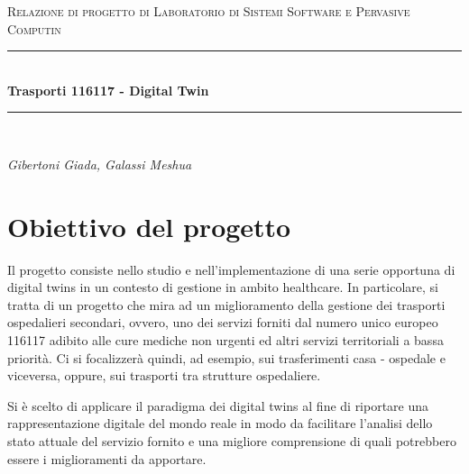 \documentclass[12pt]{article}
\begin{document}

\begin{titlepage}

\newcommand{\HRule}{\rule{\linewidth}{0.5mm}}
\center

\textsc{\Large Relazione di progetto di Laboratorio di Sistemi Software e Pervasive Computin}\\[0.5cm]

\HRule \\[0.4cm]
{ \huge \bfseries Trasporti 116117 - Digital Twin}\\[0.4cm]
\HRule \\[1.5cm]

\vfill

\begin{flushleft}
\emph{Gibertoni Giada, Galassi Meshua}\\[3cm]

\end{flushleft}



\end{titlepage}


\tableofcontents

\newpage

\section{Obiettivo del progetto}
Il progetto consiste nello studio e nell'implementazione di una serie opportuna di digital twins in un contesto di gestione in ambito healthcare.
In particolare, si tratta di un progetto che mira ad un miglioramento della gestione dei trasporti ospedalieri secondari, ovvero, uno dei servizi forniti dal numero unico europeo 116117 adibito alle cure mediche non urgenti ed altri servizi territoriali a bassa priorità.
Ci si focalizzerà quindi, ad esempio, sui trasferimenti casa - ospedale e viceversa, oppure, sui trasporti tra strutture ospedaliere.

Si è scelto di applicare il paradigma dei digital twins al fine di riportare una rappresentazione digitale del mondo reale in modo da facilitare l'analisi dello stato attuale del servizio fornito e una migliore comprensione di quali potrebbero essere i miglioramenti da apportare. 
\end{document}
